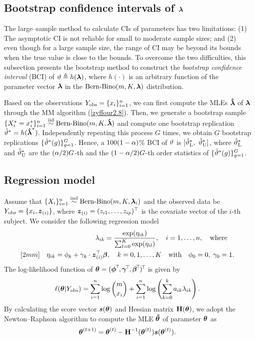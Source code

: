 \subsection{Bootstrap confidence intervals of ${\boldsymbol{\lambda}}$}  %

The large--sample method to calculate CIs of parameters has two  limitations: (1) The asymptotic CI is not reliable for small to moderate sample sizes; and (2) even though for a large sample size, the range of CI may be beyond its bounds when the true value is close to the bounds. To overcome the two difficulties, this subsection presents the bootstrap method to construct the \textit{bootstrap confidence interval} (BCI) of $\vartheta \triangleq h({\boldsymbol{\lambda}})$, where $h(\cdot)$ is an arbitrary function of the parameter vector ${\boldsymbol{\lambda}}$ in the $\mbox{Bern-Bino}(m, K, {\boldsymbol{\lambda}})$ distribution.

Based on the observations $Y_{\rm obs} = \{x_i\}_{i=1}^n$, we can first compute the MLEs $\mbox{\boldmath${\hat \lambda}$}$ of ${\boldsymbol{\lambda}}$ through the MM algorithm (\ref{zyffour2.8}). Then, we generate a bootstrap sample $\{X_i^*= x_i^*\}_{i=1}^n \stackrel{{\rm iid}}{\sim}\mbox{Bern-Bino}(m, K, \mbox{\boldmath${\hat \lambda}$})$ and compute one bootstrap replication $\hat{\vartheta}^* = h(\mbox{\boldmath${\hat \lambda}$}^*)$. Independently repeating this process $G$ times, we obtain $G$ bootstrap replications $\{\hat{\vartheta}^*(g)\}_{g=1}^G$. Hence, a $100(1-\alpha)$\% BCI of $\vartheta$ is
$[\hat{\vartheta}_{\rm L}^*, \  \hat{\vartheta}_{\rm U}^*]$, where $\hat{\vartheta}_{\rm L}^*$ and $\hat{\vartheta}_{\rm U}^*$ are the $(\alpha/2)G$-th and the $(1-\alpha/2)G$-th order statistics of $\{\hat{\vartheta}^*(g)\}_{g=1}^G$.

\subsection{Regression model}      %

Assume that $\{X_i\}_{i=1}^n \stackrel{{\rm ind}}{\sim} \mbox{Bern-Bino}(m, K, {\boldsymbol{\lambda}}_i)$ and the observed data be $Y_{\rm obs} = \{x_i, {\boldsymbol{z}}_{(i)}\}$, where ${\boldsymbol{z}}_{(i)} = (z_{i1}, \ldots, z_{ip})^\top$ is the covariate vector of the $i$-th subject. We consider the following regression model
\begin{eqnarray*}
    && \lambda_{ik} = \frac{\exp(\eta_{ik})}{\sum_{l=0}^K \exp(\eta_{il})}, \quad i = 1, \ldots, n, \quad \mbox{where} \quad \\ [2mm]
    && \eta_{ik} = \phi_k + \gamma_k \cdot {\boldsymbol{z}}_{(i)}^\top {\boldsymbol{\beta}}, \quad k = 0, 1, \ldots, K \quad \mbox{with} \quad \phi_0 = 0, \; \gamma_0 = 1.
\end{eqnarray*}
The log-likelihood function of $\bth = (\bphi^{\T}, \bga^{\T}, \bbe^{\T})^{\T}$ is given by
$$
    \ell({\boldsymbol{\theta}}|Y_{\rm obs}) = \sum_{i=1}^n \log\binom{m}{x_i} + \sum_{i=1}^n \log \left( \sum_{k=0}^k a_{ik} \lambda_{ik} \right).
$$
By calculating the score vector ${\boldsymbol{s}}({\boldsymbol{\theta}})$ and Hessian matrix ${\bf H}({\boldsymbol{\theta}})$, we adopt the Newton--Raphson algorithm to compute the MLE $\boldsymbol{\hat{\theta}}$ of parameter ${\boldsymbol{\theta}}$ as
$$
    {\boldsymbol{\theta}}^{(t+1)} = {\boldsymbol{\theta}}^{(t)} - {\bf H}^{-1} ({\boldsymbol{\theta}}^{(t)}) {\boldsymbol{s}}({\boldsymbol{\theta}}^{(t)}).
$$ 